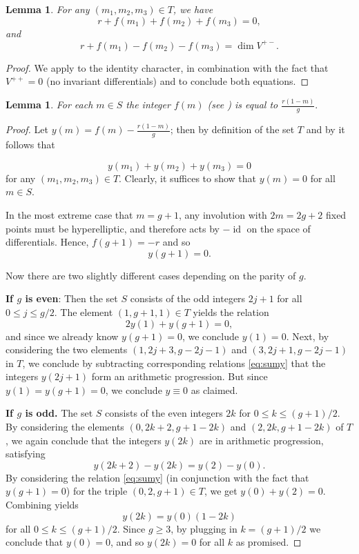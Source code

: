 \documentclass[reqno]{amsart}
\theoremstyle{plain}
\newtheorem{lemma}[theorem]{Lemma}
\DeclareMathOperator{\id}{id}
\begin{document}
\begin{lemma}
  \label{lemma:negativer} For any $(m_1,m_2,m_3) \in T$, we have 
  \[r + f(m_1) + f(m_2) + f(m_3) = 0,\] and 
  \[r + f(m_1) - f(m_2) - f(m_3) = \dim V^{+-}.\]
\end{lemma}

\begin{proof}
  We apply  to the identity character,
  in combination with the fact that $V^{++} = 0$ (no invariant differentials)
  and  to conclude both equations.
\end{proof}

\begin{lemma}
  \label{lemma:f(m)} For each $m \in S$ the integer $f(m)$ (see
  ) is equal to $\frac{r(1-m)}{g}.$
\end{lemma}

\begin{proof}
  Let $y(m) = f(m) - \frac{r(1-m)}{g}$; then by definition of the set $T$ and by
   it follows that 

  \begin{equation}
    \label{eq:sumy}
    y(m_1) + y(m_2) + y(m_3)
  = 0
\end{equation} for any $(m_1, m_2, m_3) \in T$.  Clearly, it suffices to show that $y(m) = 0$ for all $m \in S$. 

  In the most extreme case that $m = g+1$, any involution with $2m = 2g+2$ fixed points must be
  hyperelliptic, and therefore acts by $-\id$ on the space of differentials.
  Hence, $f(g+1) = -r$ and so \[y(g+1) = 0.\]

  Now there are two slightly different cases depending on the parity of $g$.  

  \textbf{If $g$ is even}: Then the set $S$ consists of the odd integers
  $2j+1$ for all $0 \leq j \leq g/2$.  The element $(1, g+1, 1) \in
  T$ yields the relation \[2y(1) + y(g+1) = 0,\] and since we already know $y(g+1)=0$, we conclude $y(1) = 0$. 
  Next, by considering the two elements $(1,2j+3,g-2j-1)$ and $(3,2j+1,g-2j-1)$
  in $T$, we conclude by subtracting corresponding relations \eqref{eq:sumy}
  that the integers $y(2j+1)$ form an arithmetic progression.  But since $y(1) =
  y(g+1) = 0$, we conclude $y \equiv 0$ as claimed. 

  \textbf{If $g$ is odd.} The set $S$ consists of the even integers $2k$ for $0
  \leq k \leq (g+1)/2$.  By considering the elements $(0,2k+2,g+1-2k)$ and
  $(2,2k,g+1-2k)$ of $T$, we again conclude that the integers $y(2k)$ are in
  arithmetic progression, satisfying \[y(2k+2) - y(2k) = y(2) - y(0).\]  By
  considering the relation \eqref{eq:sumy} (in conjunction with
  the fact that $y(g+1) = 0$)  for the triple
  $(0,2,g+1) \in T$, we get $y(0) + y(2) = 0$. Combining yields \[y(2k) =
  y(0)(1-2k)\] for all $0 \leq k \leq (g+1)/2$. Since $g \geq 3$, by
  plugging in $k = (g+1)/2$ we conclude that $y(0)=0$, and so $y(2k)=0$ for all $k$ as
  promised.  
\end{proof}
\end{document}
